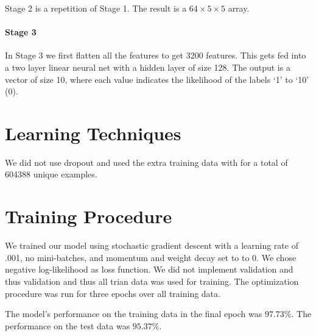 \documentclass[10pt,letterpaper]{article}
\begin{document}
Stage 2 is a repetition of Stage 1. The result is a $64\times5\times5$ array.

\paragraph{Stage 3}\label{stage-3}


In Stage 3 we first flatten all the features to get 3200 features. This
gets fed into a two layer linear neural net with a hidden layer of size
128. The output is a vector of size 10, where each value indicates the
likelihood of the labels `1' to `10' (0).

\section{Learning Techniques}\label{learning-techniques}


We did not use dropout and used the extra training data with for a
total of 604388 unique examples.

\section{Training Procedure}\label{training-procedure}



We trained our model using stochastic gradient descent with a learning rate of .001,
no mini-batches, and momentum and weight decay set to to 0. We
chose negative log-likelihood as loss function. We did not implement
validation and thus validation and thus all trian data was used for
training. The optimization procedure was run for three epochs over all training data.

The model's performance on the training data in the final epoch was $97.73\%$. The performance on the test data was $95.37\%$.
\end{document}
